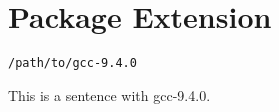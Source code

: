 
\chapter{\label{package-extension}Package Extension}
\begin{verbatim}
/path/to/gcc-9.4.0
\end{verbatim}

\par This is a sentence with gcc-9.4.0. 